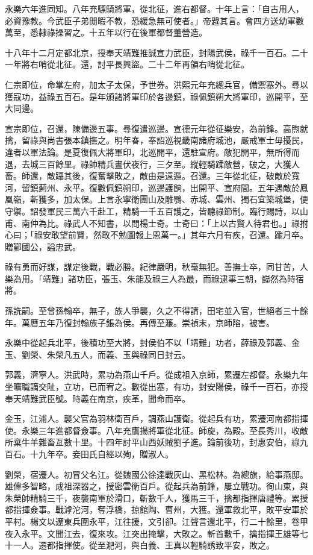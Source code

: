 \begin{pinyinscope}
永樂六年進同知。八年充驃騎將軍，從北征，進右都督。十年上言：「自古用人，必資豫教。今武臣子弟閒暇不教，恐緩急無可使者。」帝韙其言。會四方送幼軍數萬至，悉隸祿操習之。十五年以行在後軍都督董營造。

十八年十二月定都北京，授奉天靖難推誠宣力武臣，封陽武侯，祿千一百石。二十一年將右哨從北征。還，討平長興盜。二十二年再領右哨從北征。

仁宗即位，命掌左府，加太子太保，予世券。洪熙元年充總兵官，備禦塞外。尋以獲寇功，益祿五百石。是年頒諸將軍印於各邊鎮，祿佩鎮朔大將軍印，巡開平，至大同邊。

宣宗即位，召還，陳備邊五事。尋復遣巡邊。宣德元年從征樂安，為前鋒。高煦就擒，留祿與尚書張本鎮撫之。明年春，奉詔巡視畿南諸府城池，嚴戒軍士毋擾民，違者以軍法論。是夏復佩大將軍印，北巡開平，還駐宣府。敵犯開平，無所得而退，去城三百餘里。祿帥精兵晝伏夜行，三夕至。縱輕騎蹂敵營，破之，大獲人畜。師還，敵躡其後，復奮擊敗之，敵由是遠遁。召還。三年從北征，破敵於寬河，留鎮薊州、永平。復數佩鎮朔印，巡邊護餉，出開平、宣府間。五年遇敵於鳳凰嶺，斬獲多，加太保。上言永寧衛團山及雕鶚、赤城、雲州、獨石宜築城堡，便守禦。詔發軍民三萬六千赴工，精騎一千五百護之，皆聽祿節制。臨行賜詩，以山甫、南仲為比。祿武人不知書，以問楊士奇。士奇曰：「上以古賢人待君也。」祿拊心曰；「祿安敢望前賢，然敢不勉圖報上恩萬一。」其年六月有疾，召還。踰月卒。贈鄞國公，謚忠武。

祿有勇而好謀，謀定後戰，戰必勝。紀律嚴明，秋毫無犯。善撫士卒，同甘苦，人樂為用。「靖難」諸功臣，張玉、朱能及祿三人為最，而祿逮事三朝，巋然為時宿將。

孫詵嗣。至曾孫翰卒，無子，族人爭襲，久之不得請，田宅並入官，世絕者三十餘年。萬曆五年乃復封翰族子鋹為侯。再傳至濂。崇禎末，京師陷，被害。

永樂中從起兵北平，後積功至大將，封侯伯不以「靖難」功者，薛祿及郭義、金玉、劉榮、朱榮凡五人，而義、玉與祿同日封云。

郭義，濟寧人。洪武時，累功為燕山千戶。從成祖入京師，累遷左都督。永樂九年坐曠職謫交阯，立功，已而宥之。數從出塞，有功，封安陽侯，祿千一百石，亦授奉天靖難武臣號。時義在南京，疾革，聞命而卒。

金玉，江浦人。襲父官為羽林衛百戶，調燕山護衛。從起兵有功，累遷河南都指揮使。永樂三年進都督僉事。八年充鷹揚將軍從北征。師旋，為殿。至長秀川，收敵所棄牛羊雜畜亙數十里。十四年討平山西妖賊劉子進。論前後功，封惠安伯，祿九百石。十九年卒。妾田氏自經以殉，贈淑人。

劉榮，宿遷人。初冒父名江。從魏國公徐達戰灰山、黑松林。為總旗，給事燕邸。雄偉多智略，成祖深器之，授密雲衛百戶。從起兵為前鋒，屢立戰功。徇山東，與朱榮帥精騎三千，夜襲南軍於滑口，斬數千人，獲馬三千，擒都指揮唐禮等。累授都指揮僉事。戰滹沱河，奪浮橋，掠館陶、曹州，大獲。還軍救北平，敗平安軍於平村。楊文以遼東兵圍永平，江往援，文引卻。江聲言還北平，行二十餘里，卷甲夜入永平。文聞江去，復來攻。江突出掩擊，大敗之。斬首數千，擒指揮王雄等七十一人。遷都指揮使。從至淝河，與白義、王真以輕騎誘致平安，敗之。


\end{pinyinscope}
